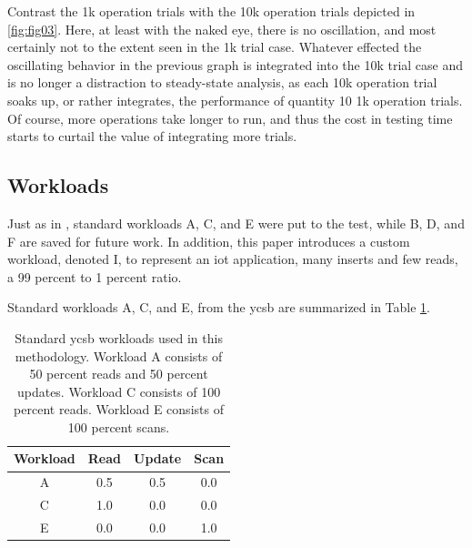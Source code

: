 Contrast the 1k operation trials with the 10k operation trials depicted in \ref{fig:fig03}.  Here, at least with the naked eye, there is no oscillation, and most certainly not to the extent seen in the 1k trial case.  Whatever effected the oscillating behavior in the previous graph is integrated into the 10k trial case and is no longer a distraction to steady-state analysis, as each 10k operation trial soaks up, or rather integrates, the performance of quantity 10 1k operation trials.  Of course, more operations take longer to run, and thus the cost in testing time starts to curtail the value of integrating more trials.

\subsection{Workloads}

Just as in \cite{Abramova2014}, standard workloads A, C, and E were put to the test, while B, D, and F are saved for future work.  In addition, this paper introduces a custom workload, denoted I, to represent an \gls{iot} application, many inserts and few reads, a 99 percent to 1 percent ratio.

Standard workloads A, C, and E, from the \gls{ycsb} are summarized in Table \ref{table:std_workloads}.
\begin{table}
\begin{center}
 \begin{tabular}{||c c c c||} 
 \hline
 Workload & Read & Update & Scan \\ [0.5ex] 
 \hline\hline
 A & 0.5 & 0.5 & 0.0 \\ 
 \hline
 C & 1.0 & 0.0 & 0.0 \\
 \hline
 E & 0.0 & 0.0 & 1.0 \\ [1ex] 
 \hline
\end{tabular}
\end{center}

\caption{Standard \gls{ycsb} workloads used in this methodology.  Workload A consists of 50 percent reads and 50 percent updates.  Workload C consists of 100 percent reads.  Workload E consists of 100 percent scans.}
\label{table:std_workloads}
\end{table}

